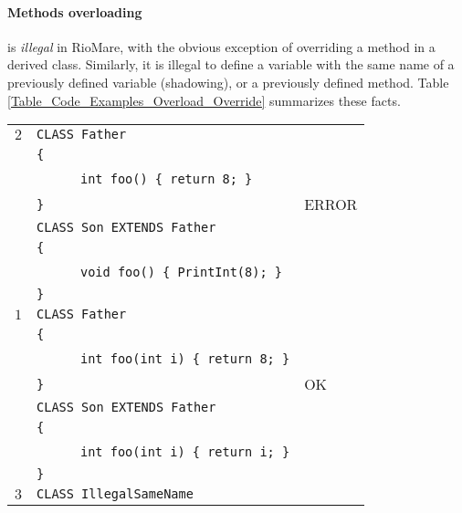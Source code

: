 \documentclass{article}
\begin{document}
\paragraph{Methods overloading} is \textit{illegal} in RioMare,
with the obvious exception of overriding a method in a derived class.
Similarly, it is illegal to define a variable with the same name of
a previously defined variable (shadowing), or a previously defined method.
Table \ref{Table_Code_Examples_Overload_Override} summarizes these facts.
\begin{table}[h]
\centering
\begin{tabular}{|l|l|l|}
\hline
 $2$ & \verb"CLASS Father"                       &       \\
     & \verb"{"                                  &       \\
     & ~ ~ ~ ~\verb"int foo() { return 8; }"     &       \\
     & \verb"}"                                  & ERROR \\
     & \verb"CLASS Son EXTENDS Father"           &       \\
     & \verb"{"                                  &       \\
     & ~ ~ ~ ~\verb"void foo() { PrintInt(8); }" &       \\
     & \verb"}"                                  &       \\
\hline
 $1$ & \verb"CLASS Father"                        &    \\
     & \verb"{"                                   &    \\
     & ~ ~ ~ ~\verb"int foo(int i) { return 8; }" &    \\
     & \verb"}"                                   & OK \\
     & \verb"CLASS Son EXTENDS Father"            &    \\
     & \verb"{"                                   &    \\
     & ~ ~ ~ ~\verb"int foo(int i) { return i; }" &    \\
     & \verb"}"                                   &    \\
\hline
 $3$ & \verb"CLASS IllegalSameName"                   &       \\

\end{tabular}
\end{table}
\end{document}
